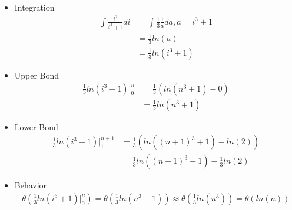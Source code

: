 \documentclass{article}
\begin{document}
\begin{itemize}
    \item Integration 
         \begin{equation}
            \begin{split}
                \int \frac{i^2}{i^3+1} di &= \int \frac{1}{3}\frac{1}{a}da, a = i^3 +1 \\
                &= \frac{1}{3}ln(a) \\
                &= \frac{1}{3}ln(i^3+1)
            \end{split}
        \end{equation}
    \item Upper Bond
        \begin{equation}
            \begin{split}
                \frac{1}{3}ln(i^3+1) \vert_0^n &= \frac{1}{3}(ln(n^3 + 1) - 0) \\
                &= \frac{1}{3}ln(n^3 + 1)
            \end{split}
        \end{equation}
    \item Lower Bond
         \begin{equation}
            \begin{split}
                \frac{1}{3}ln(i^3+1) \vert_1^{n+1} &= \frac{1}{3}(ln((n+1)^3 + 1) - ln(2)) \\
                &= \frac{1}{3}ln({(n + 1)}^3+1) - \frac{1}{3}ln(2)
            \end{split}
        \end{equation}
    \item Behavior
        \begin{equation}
            \begin{split}
                \theta(\frac{1}{3}ln(i^3+1) \vert_0^n) = \theta(\frac{1}{3}ln(n^3 + 1)) \approx \theta(\frac{1}{3}ln(n^3)) = \theta(ln(n))
            \end{split}
        \end{equation}
\end{itemize}
\end{document}
